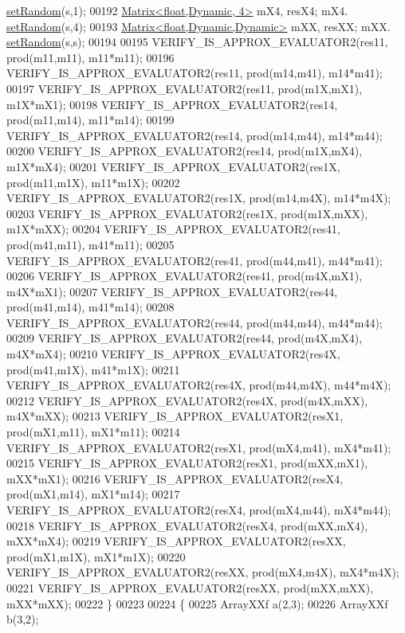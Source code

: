 \begin{DoxyCode}
      \hyperlink{class_eigen_1_1_plain_object_base_af0e576a0e1aefc9ee346de44cc352ba3}{setRandom}(s,1);
00192     \hyperlink{group___core___module_class_eigen_1_1_matrix}{Matrix<float,Dynamic,      4>} mX4, resX4;  mX4.
      \hyperlink{class_eigen_1_1_plain_object_base_af0e576a0e1aefc9ee346de44cc352ba3}{setRandom}(s,4);
00193     \hyperlink{group___core___module_class_eigen_1_1_matrix}{Matrix<float,Dynamic,Dynamic>} mXX, resXX;  mXX.
      \hyperlink{class_eigen_1_1_plain_object_base_af0e576a0e1aefc9ee346de44cc352ba3}{setRandom}(s,s);
00194 
00195     VERIFY\_IS\_APPROX\_EVALUATOR2(res11, prod(m11,m11), m11*m11);
00196     VERIFY\_IS\_APPROX\_EVALUATOR2(res11, prod(m14,m41), m14*m41);
00197     VERIFY\_IS\_APPROX\_EVALUATOR2(res11, prod(m1X,mX1), m1X*mX1);
00198     VERIFY\_IS\_APPROX\_EVALUATOR2(res14, prod(m11,m14), m11*m14);
00199     VERIFY\_IS\_APPROX\_EVALUATOR2(res14, prod(m14,m44), m14*m44);
00200     VERIFY\_IS\_APPROX\_EVALUATOR2(res14, prod(m1X,mX4), m1X*mX4);
00201     VERIFY\_IS\_APPROX\_EVALUATOR2(res1X, prod(m11,m1X), m11*m1X);
00202     VERIFY\_IS\_APPROX\_EVALUATOR2(res1X, prod(m14,m4X), m14*m4X);
00203     VERIFY\_IS\_APPROX\_EVALUATOR2(res1X, prod(m1X,mXX), m1X*mXX);
00204     VERIFY\_IS\_APPROX\_EVALUATOR2(res41, prod(m41,m11), m41*m11);
00205     VERIFY\_IS\_APPROX\_EVALUATOR2(res41, prod(m44,m41), m44*m41);
00206     VERIFY\_IS\_APPROX\_EVALUATOR2(res41, prod(m4X,mX1), m4X*mX1);
00207     VERIFY\_IS\_APPROX\_EVALUATOR2(res44, prod(m41,m14), m41*m14);
00208     VERIFY\_IS\_APPROX\_EVALUATOR2(res44, prod(m44,m44), m44*m44);
00209     VERIFY\_IS\_APPROX\_EVALUATOR2(res44, prod(m4X,mX4), m4X*mX4);
00210     VERIFY\_IS\_APPROX\_EVALUATOR2(res4X, prod(m41,m1X), m41*m1X);
00211     VERIFY\_IS\_APPROX\_EVALUATOR2(res4X, prod(m44,m4X), m44*m4X);
00212     VERIFY\_IS\_APPROX\_EVALUATOR2(res4X, prod(m4X,mXX), m4X*mXX);
00213     VERIFY\_IS\_APPROX\_EVALUATOR2(resX1, prod(mX1,m11), mX1*m11);
00214     VERIFY\_IS\_APPROX\_EVALUATOR2(resX1, prod(mX4,m41), mX4*m41);
00215     VERIFY\_IS\_APPROX\_EVALUATOR2(resX1, prod(mXX,mX1), mXX*mX1);
00216     VERIFY\_IS\_APPROX\_EVALUATOR2(resX4, prod(mX1,m14), mX1*m14);
00217     VERIFY\_IS\_APPROX\_EVALUATOR2(resX4, prod(mX4,m44), mX4*m44);
00218     VERIFY\_IS\_APPROX\_EVALUATOR2(resX4, prod(mXX,mX4), mXX*mX4);
00219     VERIFY\_IS\_APPROX\_EVALUATOR2(resXX, prod(mX1,m1X), mX1*m1X);
00220     VERIFY\_IS\_APPROX\_EVALUATOR2(resXX, prod(mX4,m4X), mX4*m4X);
00221     VERIFY\_IS\_APPROX\_EVALUATOR2(resXX, prod(mXX,mXX), mXX*mXX);
00222   \}
00223 
00224   \{
00225     ArrayXXf a(2,3);
00226     ArrayXXf b(3,2);

\end{DoxyCode}
